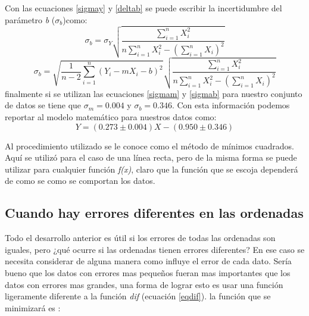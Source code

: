 \documentclass[12pt,letterpaper]{report}
\begin{document}
Con las ecuaciones \ref{sigmay} y \ref{deltab} se puede escribir la incertidumbre del parámetro \textit{b} ($ \sigma_{b} $)como:
\begin{equation}
\sigma_{b} = \sigma_{Y} \sqrt{\dfrac{\displaystyle\sum_{i=1}^{n} X_{i}^{2}}{n \displaystyle\sum_{i=1}^{n} X_{i}^{2}- \left( \displaystyle\sum_{i=1}^{n} X_{i} \right) ^{2}}}
\end{equation}
\begin{equation}\label{sigmab}
\sigma_{b} =\sqrt{\dfrac{1}{n-2}\sum_{i=1}^{n}\left( Y_{i}-mX_{i}-b \right) ^{2}} 
\sqrt{\dfrac{\displaystyle\sum_{i=1}^{n} X_{i}^{2}}{n \displaystyle\sum_{i=1}^{n} X_{i}^{2}- \left( \displaystyle\sum_{i=1}^{n} X_{i} \right) ^{2}}}
\end{equation}
finalmente si se utilizan las ecuaciones \ref{sigmam} y \ref{sigmab} para nuestro conjunto de datos se tiene que $ \sigma_{m}=0.004 $ y $ \sigma_{b} = 0.346 $. Con esta información podemos reportar al modelo matemático para nuestros datos como:
\begin{equation}
Y=(0.273 \pm 0.004) X - (0.950 \pm 0.346)
\end{equation}


Al procedimiento utilizado se le conoce como el método de mínimos cuadrados. Aquí se utilizó para el caso de una línea recta, pero de la misma forma se puede utilizar para cualquier función \textit{f(x)}, claro que la función que se escoja dependerá de como se como se comportan los datos.\\


\subsection{Cuando hay errores diferentes en las ordenadas}
Todo el desarrollo anterior es útil si los errores de todas las ordenadas son iguales, pero ¿qué ocurre si las ordenadas tienen errores diferentes? En ese caso se necesita considerar  de alguna manera como influye el error de cada dato. Sería bueno que los datos con errores mas pequeños fueran mas importantes que los datos con errores mas grandes, una forma de lograr esto es usar una función  ligeramente diferente a la función \textit{dif} (ecuación \ref{eqdif}). la función que se minimizará es :
\end{document}
